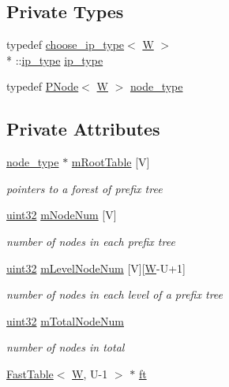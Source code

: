 \subsection*{Private Types}
\begin{DoxyCompactItemize}
\item 
typedef \hyperlink{types_8h_structchoose__ip__type}{choose\-\_\-ip\-\_\-type}$<$ \hyperlink{test__u128_8cpp_ab21b528bc38899d04d3a7053e52fb797}{W} $>$\\*
\-::\hyperlink{classRPTree_a247a4b90a027365aa8cc94c69ba141d1}{ip\-\_\-type} \hyperlink{classRPTree_a247a4b90a027365aa8cc94c69ba141d1}{ip\-\_\-type}
\item 
typedef \hyperlink{structPNode}{P\-Node}$<$ \hyperlink{test__u128_8cpp_ab21b528bc38899d04d3a7053e52fb797}{W} $>$ \hyperlink{classRPTree_a9ebcf5a1e56890f2ab50a8a1c700c35f}{node\-\_\-type}
\end{DoxyCompactItemize}
\subsection*{Private Attributes}
\begin{DoxyCompactItemize}
\item 
\hyperlink{classRPTree_a9ebcf5a1e56890f2ab50a8a1c700c35f}{node\-\_\-type} $\ast$ \hyperlink{classRPTree_a5dc7d0ead186301ede56ae8dfeec3f4a}{m\-Root\-Table} \mbox{[}V\mbox{]}
\begin{DoxyCompactList}\small\item\em pointers to a forest of prefix tree \end{DoxyCompactList}\item 
\hyperlink{types_8h_abd01e8e67e3d94cab04ecaaf4f85ac1b}{uint32} \hyperlink{classRPTree_ac0a0d943c46eb483758b0c411e596bac}{m\-Node\-Num} \mbox{[}V\mbox{]}
\begin{DoxyCompactList}\small\item\em number of nodes in each prefix tree \end{DoxyCompactList}\item 
\hyperlink{types_8h_abd01e8e67e3d94cab04ecaaf4f85ac1b}{uint32} \hyperlink{classRPTree_a1bfeccd1394ac4b6f9b706e67f9baeeb}{m\-Level\-Node\-Num} \mbox{[}V\mbox{]}\mbox{[}\hyperlink{test__u128_8cpp_ab21b528bc38899d04d3a7053e52fb797}{W}-\/U+1\mbox{]}
\begin{DoxyCompactList}\small\item\em number of nodes in each level of a prefix tree \end{DoxyCompactList}\item 
\hyperlink{types_8h_abd01e8e67e3d94cab04ecaaf4f85ac1b}{uint32} \hyperlink{classRPTree_a66f36da0f534bec580cd85098640688e}{m\-Total\-Node\-Num}
\begin{DoxyCompactList}\small\item\em number of nodes in total \end{DoxyCompactList}\item 
\hyperlink{structFastTable}{Fast\-Table}$<$ \hyperlink{test__u128_8cpp_ab21b528bc38899d04d3a7053e52fb797}{W}, U-\/1 $>$ $\ast$ \hyperlink{classRPTree_a80b8fb3d3fd9c8165fb9fc676adf6827}{ft}
\end{DoxyCompactItemize}


